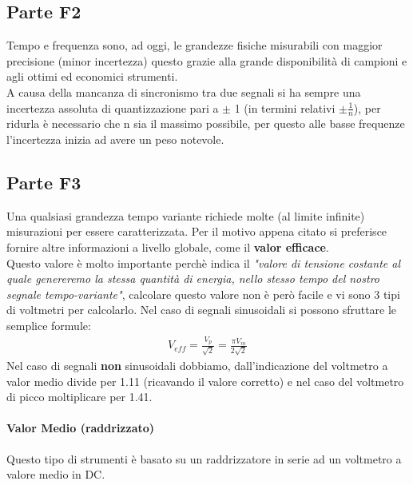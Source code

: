 \documentclass[12pt]{article}
\begin{document}
\subsection{Parte F2}\label{f2} %
Tempo e frequenza sono, ad oggi, le grandezze fisiche misurabili con maggior precisione (minor incertezza) questo grazie alla grande disponibilità di campioni e agli ottimi ed economici strumenti.\\
A causa della mancanza di sincronismo tra due segnali si ha sempre una incertezza assoluta di quantizzazione pari a $\pm$ 1 (in termini relativi $\pm\frac{1}{n}$), per ridurla è necessario che n sia il massimo possibile, per questo alle basse frequenze l'incertezza inizia ad avere un peso notevole.\\

\subsection{Parte F3}\label{f3} %
Una qualsiasi grandezza tempo variante richiede molte (al limite infinite) misurazioni per essere caratterizzata. Per il motivo appena citato si preferisce fornire altre informazioni a livello globale, come il \textbf{valor efficace}.\\
Questo valore è molto importante perchè indica il \textit{"valore di tensione costante al quale genereremo la stessa quantità di energia, nello stesso tempo del nostro segnale tempo-variante"}, calcolare questo valore non è però facile e vi sono 3 tipi di voltmetri per calcolarlo. Nel caso di segnali sinusoidali si possono sfruttare le semplice formule:\\
\begin{equation}
  \begin{gathered}
    V_{eff}=\frac{V_{p}}{\sqrt{2}}=\frac{\pi V_{m}}{2\sqrt{2}}
    \label{eq:veff}
  \end{gathered}
\end{equation}
Nel caso di segnali \textbf{non} sinusoidali dobbiamo, dall'indicazione del voltmetro a valor medio divide per 1.11 (ricavando il valore corretto) e nel caso del voltmetro di picco moltiplicare per 1.41.

\paragraph{Valor Medio (raddrizzato)} Questo tipo di strumenti è basato su un raddrizzatore in serie ad un voltmetro a valore medio in DC.
\end{document}
